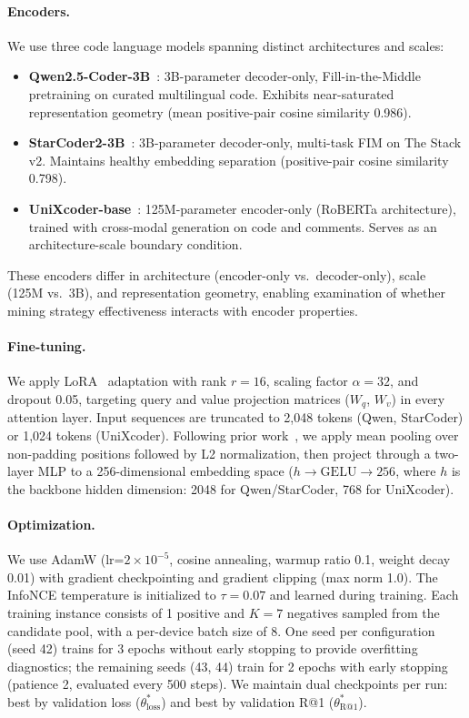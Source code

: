 \paragraph{Encoders.}
We use three code language models spanning distinct architectures and scales:
\begin{itemize}
\item \textbf{Qwen2.5-Coder-3B}~\cite{hui2024qwen25coder}: 3B-parameter decoder-only, Fill-in-the-Middle pretraining on curated multilingual code. Exhibits near-saturated representation geometry (mean positive-pair cosine similarity 0.986).
\item \textbf{StarCoder2-3B}~\cite{lozhkov2024starcoder2}: 3B-parameter decoder-only, multi-task FIM on The Stack v2. Maintains healthy embedding separation (positive-pair cosine similarity 0.798).
\item \textbf{UniXcoder-base}~\cite{guo2022unixcoder}: 125M-parameter encoder-only (RoBERTa architecture), trained with cross-modal generation on code and comments. Serves as an architecture-scale boundary condition.
\end{itemize}
These encoders differ in architecture (encoder-only vs.\ decoder-only), scale (125M vs.\ 3B), and representation geometry, enabling examination of whether mining strategy effectiveness interacts with encoder properties.

\paragraph{Fine-tuning.}
We apply LoRA~\cite{hu2022lora} adaptation with rank $r{=}16$, scaling factor $\alpha{=}32$, and dropout 0.05, targeting query and value projection matrices ($W_q$, $W_v$) in every attention layer.
Input sequences are truncated to 2,048 tokens (Qwen, StarCoder) or 1,024 tokens (UniXcoder).
Following prior work~\cite{reimers2019sentencebert,zhang2024codesage}, we apply mean pooling over non-padding positions followed by L2 normalization, then project through a two-layer MLP to a 256-dimensional embedding space ($h \to \text{GELU} \to 256$, where $h$ is the backbone hidden dimension: 2048 for Qwen/StarCoder, 768 for UniXcoder).

\paragraph{Optimization.}
We use AdamW (lr=$2 \times 10^{-5}$, cosine annealing, warmup ratio 0.1, weight decay 0.01) with gradient checkpointing and gradient clipping (max norm 1.0).
The InfoNCE temperature is initialized to $\tau{=}0.07$ and learned during training.
Each training instance consists of 1 positive and $K{=}7$ negatives sampled from the candidate pool, with a per-device batch size of 8.
One seed per configuration (seed 42) trains for 3 epochs without early stopping to provide overfitting diagnostics; the remaining seeds (43, 44) train for 2 epochs with early stopping (patience 2, evaluated every 500 steps).
We maintain dual checkpoints per run: best by validation loss ($\theta^*_{\text{loss}}$) and best by validation R@1 ($\theta^*_{\text{R@1}}$).

